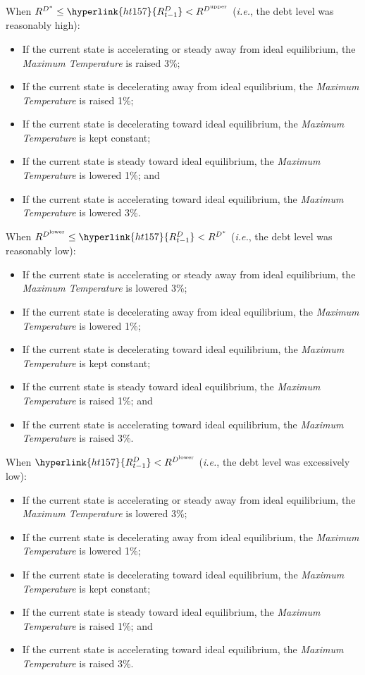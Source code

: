 \documentclass[tikz]{article}
\newcommand{\term}[1]{\textsl{#1}}
\begin{document}
When $R^{D^*} \leq \hyperlink{ht157}{R^D_{t-1}} < R^{D^{\text{upper}}}$ (\term{i.e.}, the debt level was reasonably high):

\begin{itemize}[midsep]
    \item If the current state is accelerating or steady away from ideal equilibrium, the \term{Maximum Temperature} is raised 3\%;
    \item If the current state is decelerating away from ideal equilibrium, the \term{Maximum Temperature} is raised 1\%;
    \item If the current state is decelerating toward ideal equilibrium, the \term{Maximum Temperature} is kept constant;
    \item If the current state is steady toward ideal equilibrium, the \term{Maximum Temperature} is lowered 1\%; and
    \item If the current state is accelerating toward ideal equilibrium, the \term{Maximum Temperature} is lowered 3\%.
\end{itemize}

When $ R^{D^{\text{lower}}} \leq \hyperlink{ht157}{R^D_{t-1}} < R^{D^*}$ (\term{i.e.}, the debt level was reasonably low):

\begin{itemize}[midsep]
    \item If the current state is accelerating or steady away from ideal equilibrium, the \term{Maximum Temperature} is lowered 3\%;
    \item If the current state is decelerating away from ideal equilibrium, the \term{Maximum Temperature} is lowered 1\%;
    \item If the current state is decelerating toward ideal equilibrium, the \term{Maximum Temperature} is kept constant;
    \item If the current state is steady toward ideal equilibrium, the \term{Maximum Temperature} is raised 1\%; and
    \item If the current state is accelerating toward ideal equilibrium, the \term{Maximum Temperature} is raised 3\%.
\end{itemize}

When $\hyperlink{ht157}{R^D_{t-1}} < R^{D^{\text{lower}}}$ (\term{i.e.}, the debt level was excessively low):

\begin{itemize}[midsep]
    \item If the current state is accelerating or steady away from ideal equilibrium, the \term{Maximum Temperature} is lowered 3\%;
    \item If the current state is decelerating away from ideal equilibrium, the \term{Maximum Temperature} is lowered 1\%;
    \item If the current state is decelerating toward ideal equilibrium, the \term{Maximum Temperature} is kept constant;
    \item If the current state is steady toward ideal equilibrium, the \term{Maximum Temperature} is raised 1\%; and
    \item If the current state is accelerating toward ideal equilibrium, the \term{Maximum Temperature} is raised 3\%.
\end{itemize}
\end{document}
